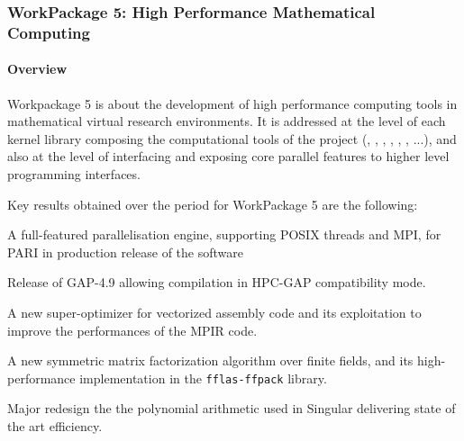   \subsubsection{WorkPackage 5: High Performance Mathematical Computing}
  \label{hpc}


  \paragraph{Overview}

  Workpackage 5 is about the development of high performance computing tools in
  mathematical virtual research environments. It is addressed at the level
  of each kernel library composing the computational tools of the project (\Pari,
  \GAP, \Linbox, \MPIR, \Sage, \Singular, ...), and also at the level of interfacing and exposing
  core parallel features to higher level programming interfaces.

  Key results obtained over the period for WorkPackage 5 are the following:
  \begin{compactitem}
  \item A full-featured parallelisation engine, supporting POSIX threads and
  MPI, for PARI in production release of the software
  \item Release of GAP-4.9 allowing compilation  in HPC-GAP compatibility mode.
    \item A new super-optimizer for vectorized assembly code and its
    exploitation to improve the performances of the MPIR code.
  \item A new symmetric matrix factorization algorithm over finite fields, and
  its high-performance implementation in the \texttt{fflas-ffpack} library.
  \item Major redesign the the polynomial arithmetic used in Singular delivering
  state of the art efficiency.
\end{compactitem}

